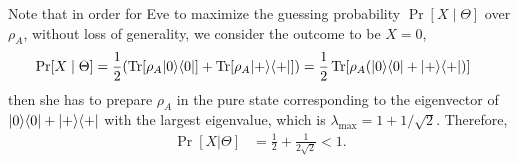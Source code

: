 Note that in order for Eve to maximize the guessing probability $\Pr[X \mid \Theta]$ over $\rho_{A}$, without loss of generality, we consider the outcome to be $X = 0$,
\begin{align*}
    \Pr[X \mid \Theta] 
    &= \frac{1}{2} (\operatorname{Tr}[\rho_{A} |0 \rangle \langle 0|] + \operatorname{Tr}[\rho_{A} |+ \rangle \langle +|])= \frac{1}{2} \operatorname{Tr}[\rho_{A} (|0 \rangle \langle 0| + |+ \rangle \langle +|)]
\end{align*}
then she has to prepare $\rho_{A}$ in the pure state corresponding to the eigenvector of $|0 \rangle \langle 0| + |+ \rangle \langle +|$ with the largest eigenvalue, which is $\lambda_{\max} 
    = 1 + {1/\sqrt{2}}.$
Therefore,
\begin{align*}
    \Pr[X |\Theta] 
    &= \frac{1}{2} + \frac{1}{2 \sqrt{2}} 
    < 1.
\end{align*}

